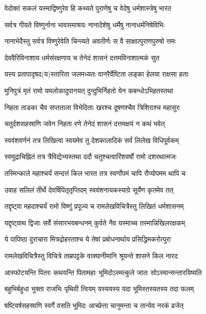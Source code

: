\twolineshloka
{वेदोक्तं सकलं यस्माद्विष्णुरेव हि कथ्यते}
{पुराणेषु च वेदेषु धर्मशास्त्रेषु भारत}%

\twolineshloka
{सर्वत्र गीयते विष्णुर्नाना भावसमाश्रयः}
{नानादेशेषु धर्मेषु नानाधर्मनिषेविभिः}%

\twolineshloka
{नानाभेदैस्तु सर्वत्र विष्णुरेवेति चिन्त्यते}
{अवतीर्णः स वै साक्षात्पुराणपुरुषो त्तमः}%

\twolineshloka
{देववैरिविनाशाय धर्मसंरक्षणाय च}
{तेनेदं शासनं दत्तमविनाशात्मकं सुत}%

\twolineshloka
{यस्य प्रतापादृषद(य)स्तारिता जलमध्यतः}
{वानरैर्वेष्टिता लङ्का हेलया राक्षसा हताः}%

\twolineshloka
{मुनिपुत्रं मृतं रामो यमलोकादुपानयत्}
{दुन्दुभिर्निहतो येन कबन्धोऽभिहतस्तथा}%

\twolineshloka
{निहता ताडका चैव सप्तताला विभेदिताः}
{खरश्च दूषणश्चैव त्रिशिराश्च महासुरः}%

\twolineshloka
{चतुर्दशसहस्राणि जवेन निहता रणे}
{तेनेदं शासनं दत्तमक्षयं न कथं भवेत्}%

\twolineshloka
{स्ववंशवर्णनं तत्र लिखित्वा स्वयमेव तु}
{देशकालादिकं सर्वं लिलेख विधिपूर्वकम्}%

\twolineshloka
{स्वमुद्राचिह्नितं तत्र त्रैविद्येभ्यस्तथा ददौ}
{चतुश्चत्वारिंशवर्षो रामो दशरथात्मजः}%

\twolineshloka
{तस्मिन्काले महाश्चर्यं सन्दत्तं किल भारत}
{तत्र स्वर्णोपमं चापि रौप्योपमम थापि च}%

\twolineshloka
{उवाह सलिलं तीर्थे देवर्षिपितृतृप्तिदम्}
{स्ववंशनायकस्याग्रे सूर्येण कृतमेव तत्}%

\twolineshloka
{तद्दृष्ट्वा महदाश्चर्यं रामो विष्णुं प्रपूज्य च}
{रामलेखविचित्रैस्तु लिखितं धर्मशासनम्}%

\twolineshloka
{यद्दृष्ट्वाथ द्विजाः सर्वे संसारभयबन्धनम्}
{कुर्वते नैव यस्माच्च तस्मान्निखिलरक्षकम्}%

\twolineshloka
{ये पापिष्ठा दुराचारा मित्रद्रोहरताश्च ये}
{तेषां प्रबोधनार्थाय प्रसिद्धिमकरोत्पुरा}%

\twolineshloka
{रामलेखविचित्रैस्तु विचित्रे ताम्रपट्टके}
{वाक्यानीमानि श्रूयन्ते शासने किल नारद}%

\twolineshloka
{आस्फोटयन्ति पितरः कथयन्ति पितामहाः}
{भूमिदोऽस्मत्कुले जातः सोऽस्मान्सन्तारयिष्यति}%

\twolineshloka
{बहुभिर्बहुधा भुक्ता राजभिः पृथिवी त्वियम्}
{यस्ययस्य यदा भूमिस्तस्यतस्य तदा फलम्}%

\twolineshloka
{षष्टिवर्षसहस्राणि स्वर्गे वसति भूमिदः}
{आच्छेत्ता चानुमन्ता च तान्येव नरकं व्रजेत्}%

